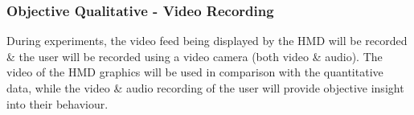 
\subsubsection{Objective Qualitative - Video Recording}
During experiments, the video feed being displayed by the HMD will be recorded \& the user will be recorded using a video camera (both video \& audio). The video of the HMD graphics will be used in comparison with the quantitative data, while the video \& audio recording of the user will provide objective insight into their behaviour.


